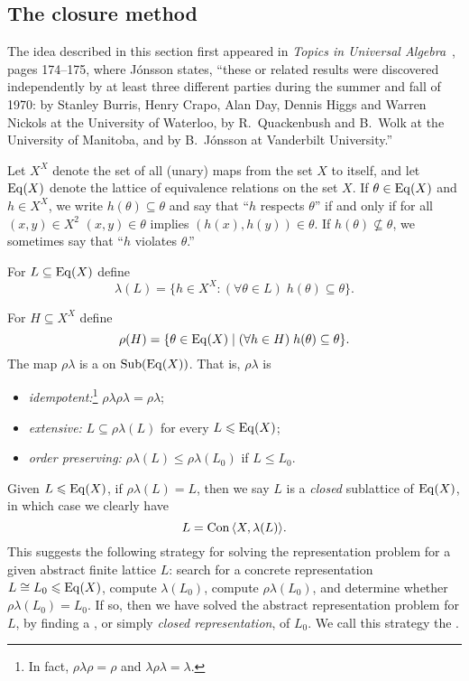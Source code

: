 \subsection{The closure method}
\label{sec:closure-method}
The idea described in this section
first appeared in \emph{Topics in Universal Algebra}~\cite{Jonsson:1972}, pages
174--175, where J\'onsson states, ``these or related results were discovered
independently by at least three different parties during the summer and fall of
1970: by Stanley Burris, Henry Crapo, Alan Day, Dennis Higgs and Warren Nickols
at the University of Waterloo, by R.~Quackenbush and B.~Wolk at the University
of Manitoba, and by B.~J\'{o}nsson at Vanderbilt University.''

Let $X^X$ denote the set of all (unary) maps from the set $X$ to itself, and let 
$\operatorname{Eq}(X)$ denote the lattice of equivalence relations on the set $X$.  If $\theta
\in \operatorname{Eq}(X)$ and $h\in X^X$, we write $h(\theta) \subseteq \theta$ and say
that ``$h$ respects $\theta$'' if and only if for all $(x,y)\in X^2$ $(x,y)\in
\theta$ implies 
$(h(x),h(y)) \in \theta$.  If $h(\theta) \nsubseteq \theta$, we sometimes say
that ``$h$ violates $\theta$.''

For $L\subseteq \operatorname{Eq}(X)$ define
\[
\lambda(L) = \{h\in X^X: (\forall \theta \in L) \; h(\theta) \subseteq \theta \}.
\]

For $H\subseteq X^X$ define
\[
\rho(H) = \{\theta \in \operatorname{Eq}(X) \mid   (\forall h\in H) \; h(\theta) \subseteq \theta\}.
\]
The map $\rho \lambda$ is a  on $\operatorname{Sub}(\operatorname{Eq}(X))$.
That is, $\rho \lambda$ is
\begin{itemize}
\item \emph{idempotent:}\footnote{In fact, $\rho \lambda \rho = \rho$ and 
  $\lambda \rho \lambda = \lambda$.} $\rho \lambda \rho \lambda = \rho \lambda$;
\item \emph{extensive:} $L \subseteq \rho \lambda (L)$ for every $L \leqslant \operatorname{Eq}(X)$;
\item \emph{order preserving:} $\rho \lambda (L) \leq \rho \lambda (L_0)$ if $L \leq L_0$.
\end{itemize}
Given $L\leqslant \operatorname{Eq}(X)$, if $\rho\lambda(L) = L$, then we say $L$ is a 
\emph{closed} sublattice of $\operatorname{Eq}(X)$, in which case we clearly have
\[L = \operatorname{Con\,} \langle X, \lambda(L)\rangle.\]
This suggests the following strategy for solving the representation problem for a
given abstract finite lattice $L$: search for a concrete representation $L \cong
L_0\leqslant \operatorname{Eq}(X)$,
compute $\lambda(L_0)$, compute $\rho\lambda(L_0)$, and determine whether 
$\rho\lambda(L_0) = L_0$.  If so, then we have solved the abstract representation
problem for $L$, by finding a , or simply
\emph{closed representation}, of $L_0$.  We call this strategy the .


